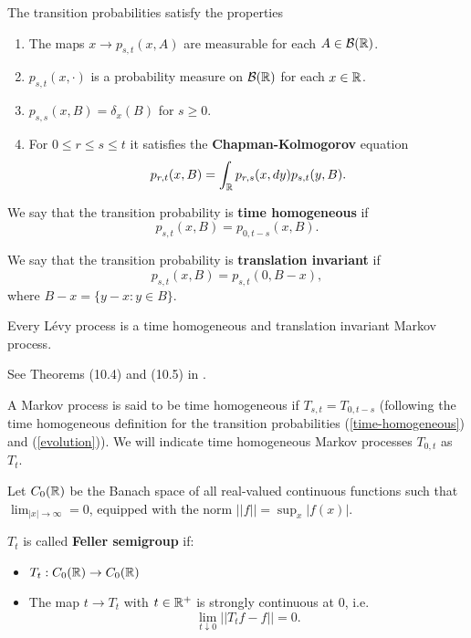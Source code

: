 The transition probabilities satisfy the properties
 \begin{enumerate}
  \item The maps $x \to p_{s,t}(x,A)$ are measurable for each $A\in \mathcal{B}(\mathbb{R})$.
  \item $p_{s,t}(x,\cdot)$ is a probability measure on $\mathcal{B}(\mathbb{R})$ for each $x \in \mathbb{R}$.
  \item $p_{s,s}(x,B) = \delta_x(B)$ for $s \geq 0$. 
  \item For $0\leq r \leq s \leq t$ it satisfies the \textbf{Chapman-Kolmogorov} equation
  \begin{equation}
   p_{r,t}(x,B) = \int_{\mathbb{R}} p_{r,s}(x,dy) p_{s,t}(y,B). 
  \end{equation}  
 \end{enumerate}

\begin{Definition}\label{time-homogeneous}
We say that the transition probability is \textbf{time homogeneous} if 
\begin{equation}
 p_{s,t}(x,B) = p_{0,t-s}(x,B).
\end{equation}
\end{Definition}
\begin{Definition}
We say that the transition probability is \textbf{translation invariant} if 
\begin{equation}
 p_{s,t}(x,B) = p_{s,t}(0,B-x),
\end{equation}
where $B-x = \{y-x : y\in B \}$.
\end{Definition}

\begin{Theorem}
Every Lévy process is a time homogeneous and translation invariant Markov process.
\end{Theorem}
See Theorems (10.4) and (10.5) in \cite{Sato}.

A Markov process is said to be time homogeneous if $T_{s,t} = T_{0,t-s}$ 
(following the time homogeneous definition for the transition probabilities
(\ref{time-homogeneous}) and (\ref{evolution})). We will indicate time homogeneous Markov processes $T_{0,t}$ as $T_t$.

Let $C_0(\mathbb{R})$ be the Banach space of all real-valued continuous functions such that $\lim_{|x|\to \infty} = 0$, equipped with the norm $||f|| = \sup_x |f(x)|$.

$T_t$ is called \textbf{Feller semigroup} if:
\begin{itemize}
 \item $T_t : C_0(\mathbb{R}) \to C_0(\mathbb{R}) $ 
 \item The map $t \to T_t $ with $t \in \mathbb{R}^+$ is strongly continuous at 0, i.e. $$\lim_{t \downarrow 0} ||T_t f - f|| = 0.$$ 
\end{itemize}


